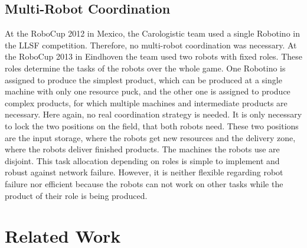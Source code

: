 \documentclass[a4paper,11pt]{article}
\begin{document}
\subsection{Multi-Robot Coordination}
At the RoboCup 2012 in Mexico, the Carologistic team used a single Robotino in the LLSF competition. Therefore, no multi-robot coordination was necessary. At the RoboCup 2013 in Eindhoven the team used two robots with fixed roles. These roles determine the tasks of the robots over the whole game. One Robotino is assigned to produce the simplest product, which can be produced at a single machine with only one resource puck, and the other one is assigned to produce complex products, for which multiple machines and intermediate products are necessary. Here again, no real coordination strategy is needed. It is only necessary to lock the two positions on the field, that both robots need. These two positions are the input storage, where the robots get new resources and the delivery zone, where the robots deliver finished products. The machines the robots use are disjoint. This task allocation depending on roles is simple to implement and robust against network failure. However, it is neither flexible regarding robot failure nor efficient because the robots can not work on other tasks while the product of their role is being produced.\\

\section{Related Work}
\end{document}
